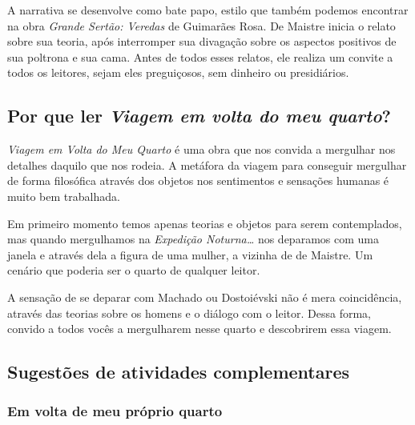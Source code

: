 \documentclass[12pt]{extarticle}
\begin{document}
A narrativa se desenvolve como bate papo, estilo que também podemos
encontrar na obra \textit{Grande Sertão: Veredas} de Guimarães Rosa. De
Maistre inicia o relato sobre sua teoria, após interromper sua divagação
sobre os aspectos positivos de sua poltrona e sua cama. Antes de todos
esses relatos, ele realiza um convite a todos os leitores, sejam eles
preguiçosos, sem dinheiro ou presidiários.




\subsection{Por que ler \textit{Viagem em volta do meu quarto}?}

\emph{Viagem em Volta do Meu Quarto} é uma obra que nos convida a
mergulhar nos detalhes daquilo que nos rodeia. A metáfora da viagem para
conseguir mergulhar de forma filosófica através dos objetos nos
sentimentos e sensações humanas é muito bem trabalhada.

Em primeiro momento temos apenas teorias e objetos para serem
contemplados, mas quando mergulhamos na \emph{Expedição Noturna\ldots} nos
deparamos com uma janela e através dela a figura de uma mulher, a
vizinha de de Maistre. Um cenário que poderia ser o quarto de qualquer
leitor.

A sensação de se deparar com Machado ou Dostoiévski não é mera
coincidência, através das teorias sobre os homens e o diálogo com o
leitor. Dessa forma, convido a todos vocês a mergulharem nesse quarto e
descobrirem essa viagem.






\subsection{Sugestões de atividades complementares}

\subsubsection{Em volta de meu próprio quarto}
\end{document}
